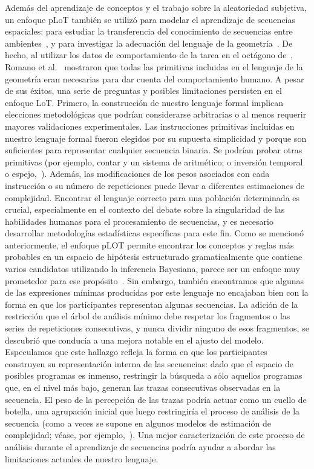 Además del aprendizaje de conceptos y el trabajo sobre la aleatoriedad subjetiva, un enfoque pLoT también se utilizó para modelar el aprendizaje de secuencias espaciales: para estudiar la transferencia del conocimiento de secuencias entre ambientes~\cite{yildirim2015learning}, y para investigar la adecuación del lenguaje de la geometría~\cite{romano2018bayesian}. De hecho, al utilizar los datos de comportamiento de la tarea en el octágono de~\cite{amalric2017language}, Romano et al.~\cite{romano2018bayesian} mostraron que todas las primitivas incluidas en el lenguaje de la geometría eran necesarias para dar cuenta del comportamiento humano. A pesar de sus éxitos, una serie de preguntas y posibles limitaciones persisten en el enfoque LoT. Primero, la construcción de nuestro lenguaje formal implican elecciones metodológicas que podrían considerarse arbitrarias o al menos requerir mayores validaciones experimentales. Las instrucciones primitivas incluidas en nuestro lenguaje formal fueron elegidos por su supuesta simplicidad y porque son suficientes para representar cualquier secuencia binaria. Se podrían probar otras primitivas (por ejemplo, contar y un sistema de aritmético; o inversión temporal o espejo,~\cite{f10}). Además, las modificaciones de los pesos asociados con cada instrucción o su número de repeticiones puede llevar a diferentes estimaciones de complejidad. Encontrar el lenguaje correcto para una población determinada es crucial, especialmente en el contexto del debate sobre la singularidad de las habilidades humanas para el procesamiento de secuencias, y es necesario desarrollar metodologías estadísticas específicas para este fin. Como se mencionó anteriormente, el enfoque pLOT permite encontrar los conceptos y reglas más probables en un espacio de hipótesis estructurado gramaticalmente que contiene varios candidatos utilizando la inferencia Bayesiana, parece ser un enfoque muy prometedor para ese propósito~\cite{goodman2008rational,piantadosi2016four,romano2018bayesian}. Sin embargo, también encontramos que algunas de las expresiones mínimas producidas por este lenguaje no encajaban bien con la forma en que los participantes representan algunas secuencias. La adición de la restricción que el árbol de análisis mínimo debe respetar los fragmentos o las series de repeticiones consecutivas, y nunca dividir ninguno de esos fragmentos, se descubrió que conducía a una mejora notable en el ajusto del modelo. Especulamos que este hallazgo refleja la forma en que los participantes construyen su representación interna de las secuencias: dado que el espacio de posibles programas es inmenso, restringir la búsqueda a sólo aquellos programas que, en el nivel más bajo, generan las trazas consecutivas observadas en la secuencia. El peso de la percepción de las trazas podría actuar como un cuello de botella, una agrupación inicial que luego restringiría el proceso de análisis de la secuencia (como a veces se supone en algunos modelos de estimación de complejidad; véase, por ejemplo,~\cite{f98}). Una mejor caracterización de este proceso de análisis durante el aprendizaje de secuencias podría ayudar a abordar las limitaciones actuales de nuestro lenguaje.

